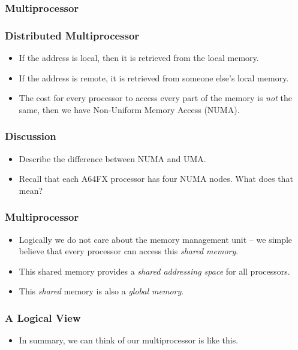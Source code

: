 \documentclass{beamer}
\begin{document}
\begin{CJK}{UTF8}{bsmi}
\begin{frame}
\frametitle{Multiprocessor}
\centerline{}
\end{frame}

\begin{frame}
\frametitle{Distributed Multiprocessor}
\begin{itemize}
\item If the address is local, then it is retrieved from the
  local memory.
\item If the address is remote, it is retrieved from someone else's local memory.
\item The cost for every processor to access every part of the memory
  is {\em not} the same, then we have Non-Uniform Memory Access
  (NUMA).
\end{itemize}
\end{frame}

\begin{frame}
\frametitle{Discussion}
\begin{itemize}
\item Describe the difference between NUMA and UMA.
\item Recall that each A64FX processor has four NUMA nodes.  What does that mean?
\end{itemize}
\end{frame}

\begin{frame}
\frametitle{Multiprocessor}
\begin{itemize}
\item Logically we do not care about the memory management unit -- we
  simple believe that every processor can access this {\em shared
    memory}.
\item This shared memory provides a {\em shared addressing space} for
  all processors.
\item This {\em shared} memory is also a {\em global memory}.
\end{itemize}
\end{frame}


\begin{frame}
\frametitle{A Logical View}
\begin{itemize}
\item In summary, we can think of our multiprocessor is like this.
\end{itemize}
\centerline{}
\end{frame}


\end{CJK}
\end{document}
